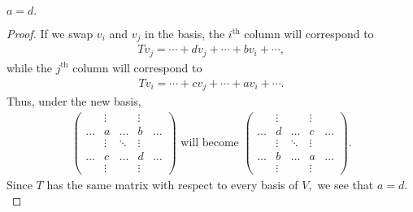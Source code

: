 \documentclass{amsart}
\begin{document}
\begin{claim*}
$a=d.$
\end{claim*}
\begin{proof}
If we swap $v_i$ and $v_j$ in the basis, the $i^\text{th}$
column will correspond to
\begin{align*}
Tv_j=\cdots+dv_j+\cdots+bv_i+\cdots,
\end{align*}
while the $j^\text{th}$ column will correspond to
\begin{align*}
Tv_i=\cdots+cv_j+\cdots+av_i+\cdots.
\end{align*}
Thus, under the new basis,
\begin{align*}
    \begin{pmatrix}
        & \vdots & & \vdots & \\
       \hdots & a & \hdots & b & \hdots \\
                & \vdots & \ddots & \vdots & \\
       \hdots & c & \hdots & d & \hdots \\
              & \vdots & & \vdots &
    \end{pmatrix}
    \text{ will become }
    \begin{pmatrix}
        & \vdots & & \vdots & \\
       \hdots & d & \hdots & c & \hdots \\
                & \vdots & \ddots & \vdots & \\
       \hdots & b & \hdots & a & \hdots \\
              & \vdots & & \vdots &
    \end{pmatrix}.
\end{align*}
Since $T$ has the same matrix with respect to
every basis of $V,$ we see that $a=d.$
\end{proof}
\end{document}
